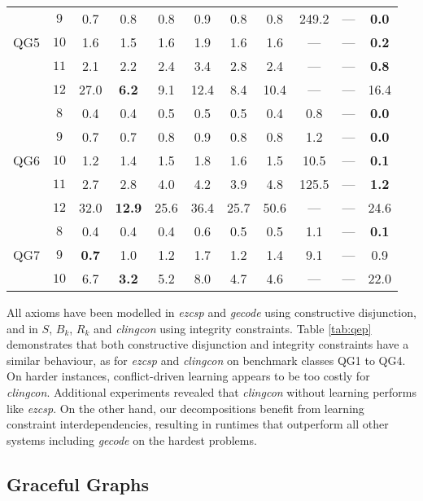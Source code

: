\documentclass{tlp}
\newcommand{\systemname}[1]{\emph{#1}}
\begin{document}
\begin{table}
\begin{minipage}{\textwidth}
\begin{tabular}{ccccccccccc}
& $9$ & 0.7 & 0.8 &0.8 & 0.9 & 0.8 & 0.8 &249.2& --- & \textbf{0.0} \\
QG5 & $10$& 1.6 & 1.5 &1.6 & 1.9 & 1.6 & 1.6 & --- & --- & \textbf{0.2} \\
& $11$& 2.1 & 2.2 &2.4 & 3.4 & 2.8 & 2.4 & --- & --- & \textbf{0.8} \\
& $12$&27.0 &\textbf{6.2}&9.1 &12.4 & 8.4 &10.4 & --- & --- & 16.4 \\ \noalign{\vspace {.2cm}}
& $8$ & 0.4 & 0.4 &0.5 & 0.5 & 0.5 & 0.4 & 0.8 & --- & \textbf{0.0} \\
& $9$ & 0.7 & 0.7 &0.8 & 0.9 & 0.8 & 0.8 & 1.2 & --- & \textbf{0.0} \\
QG6 & $10$& 1.2 & 1.4 &1.5 & 1.8 & 1.6 & 1.5 &10.5 & --- & \textbf{0.1} \\
& $11$& 2.7 & 2.8 &4.0 & 4.2 & 3.9 & 4.8 &125.5& --- & \textbf{1.2} \\
& $12$&32.0 &\textbf{12.9}&25.6 &36.4 &25.7 &50.6 & --- & --- & 24.6 \\ \noalign{\vspace {.2cm}}
& $8$ & 0.4 & 0.4 &0.4 & 0.6 & 0.5 & 0.5 & 1.1 & --- & \textbf{0.1} \\
QG7 & $9$ & \textbf{0.7} & 1.0 &1.2 & 1.7 & 1.2 & 1.4 & 9.1 & --- & 0.9 \\
& $10$ & 6.7 & \textbf{3.2} &5.2 & 8.0 & 4.7 & 4.6 & --- & --- & 22.0 \\ \hline\hline
\end{tabular}
\vspace{-2\baselineskip}
\end{minipage}
\end{table}
All axioms have been modelled in \systemname{ezcsp} and \systemname{gecode} using constructive disjunction, and in $S$, $B_k$, $R_k$ and \systemname{clingcon} using integrity constraints.
Table \ref{tab:qep} demonstrates that both constructive disjunction and integrity constraints have a similar behaviour, as for \systemname{ezcsp} and \systemname{clingcon} on benchmark classes QG1 to QG4. On harder instances, 
conflict-driven learning appears to be too costly for \systemname{clingcon}. Additional experiments revealed that \systemname{clingcon} without learning performs like \systemname{ezcsp}. 
On the other hand, our decompositions benefit from learning constraint interdependencies, resulting in runtimes that outperform all other systems including \systemname{gecode} on the hardest problems.


\subsection{Graceful Graphs}
\end{document}
